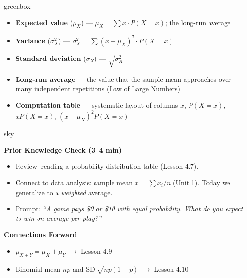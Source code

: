 \documentclass[10pt]{article}
\begin{document}
\begin{skillbox}{greenbox}
\begin{minipage}[t]{0.48\linewidth}
    \begin{itemize}
        \item \textbf{Expected value} ($\mu_X$) --- $\mu_X = \sum x \cdot P(X=x)$;
              the long-run average
        \item \textbf{Variance} ($\sigma^2_X$) --- $\sigma^2_X = \sum (x-\mu_X)^2 \cdot P(X=x)$
        \item \textbf{Standard deviation} ($\sigma_X$) --- $\sqrt{\sigma^2_X}$
    \end{itemize}
\end{minipage}
\hfill
\begin{minipage}[t]{0.48\linewidth}
    \begin{itemize}
        \item \textbf{Long-run average} --- the value that the sample mean approaches
              over many independent repetitions (Law of Large Numbers)
        \item \textbf{Computation table} --- systematic layout of columns
              $x$, $P(X=x)$, $x P(X=x)$, $(x-\mu_X)^2 P(X=x)$
    \end{itemize}
\end{minipage}
\end{skillbox}

\begin{skillbox}{sky}
    \begin{minipage}[t]{0.58\linewidth}\vspace{0pt}
        \textbf{Prior Knowledge Check (3--4 min)}
        \begin{itemize}
            \item Review: reading a probability distribution table (Lesson 4.7).
            \item Connect to data analysis: sample mean $\bar{x}=\sum x_i/n$ (Unit 1).
                  Today we generalize to a \emph{weighted} average.
            \item Prompt: \textit{``A game pays \$0 or \$10 with equal probability.
                  What do you expect to win on average per play?''}
        \end{itemize}
        \textbf{Connections Forward}
        \begin{itemize}
            \item $\mu_{X+Y} = \mu_X + \mu_Y$ $\to$ Lesson 4.9
            \item Binomial mean $np$ and SD $\sqrt{np(1-p)}$ $\to$ Lesson 4.10
        \end{itemize}
    \end{minipage}
    \hfill
    \begin{minipage}[t]{0.38\linewidth}\vspace{0pt}\centering
    \end{minipage}
\end{skillbox}
\end{document}
